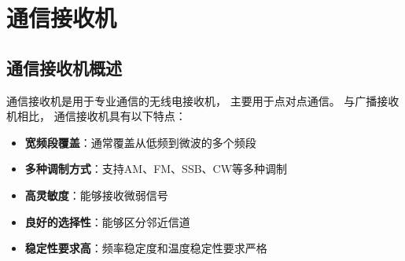 
\chapter{通信接收机}
\label{chap:communication_receiver}

\section{通信接收机概述}
\label{sec:comm_receiver_intro}

通信接收机是用于专业通信的无线电接收机，
主要用于点对点通信。
与广播接收机相比，
通信接收机具有以下特点：

\begin{itemize}
    \item \textbf{宽频段覆盖}：通常覆盖从低频到微波的多个频段
    \item \textbf{多种调制方式}：支持AM、FM、SSB、CW等多种调制
    \item \textbf{高灵敏度}：能够接收微弱信号
    \item \textbf{良好的选择性}：能够区分邻近信道
    \item \textbf{稳定性要求高}：频率稳定度和温度稳定性要求严格
\end{itemize}

